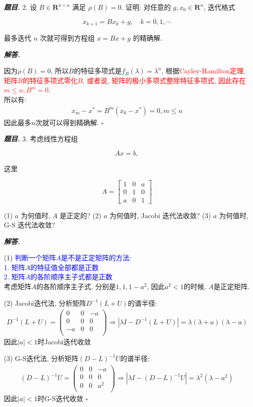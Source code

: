 \documentclass[10pt, a4paper, oneside]{ctexart}
\newenvironment{problem}{\begin{framed}\par\noindent\textbf{\textit{题目. }}}{\end{framed}\par}
\newenvironment{solution}{%
  \par\noindent\textbf{\textit{解答. }}\ignorespaces
}{%
  \hfill\ensuremath{\square}\par %
}
\begin{document}
\begin{problem}
    2. 设 $B \in \mathbf{R}^{n \times n}$ 满足 $\rho(B)=0$. 证明: 对任意的 $g, x_0 \in \mathbf{R}^n$, 迭代格式

    $$
    x_{k+1}=B x_k+g, \quad k=0,1, \cdots
    $$
    
    
    最多迭代 $n$ 次就可得到方程组 $x=B x+g$ 的精确解.
\end{problem}
\begin{solution}
因为$\rho(B)=0$, 所以$B$的特征多项式是$f_B(\lambda)=\lambda^n$, 根据\textcolor{red}{Cayley-Hamilton定理, 矩阵$B$的特征多项式零化$B$, 或者说, 矩阵的极小多项式整除特征多项式, 因此存在$m\leq n, B^m=0$}.\\
所以有:
\begin{align*}
    x_{m}-x^*=B^m(x_0-x^*)=0, m\leq n
\end{align*}
因此最多$n$次就可以得到精确解.
\end{solution}

\begin{problem}
    3. 考虑线性方程组

    $$
    A x=b,
    $$
    
    
    这里
    
    $$
    A=\left[\begin{array}{lll}
    1 & 0 & a \\
    0 & 1 & 0 \\
    a & 0 & 1
    \end{array}\right]
    $$
    
    (1) $a$ 为何值时, $A$ 是正定的?
    (2) $a$ 为何值时, Jacobi 迭代法收敛?
    (3) $a$ 为何值时, G-S 迭代法收敛?
\end{problem}
\begin{solution}
(1) \textcolor{blue}{判断一个矩阵$A$是不是正定矩阵的方法: \\
1. 矩阵$A$的特征值全部都是正数\\
2. 矩阵$A$的各阶顺序主子式都是正数}\\
考虑矩阵$A$的各阶顺序主子式, 分别是$1,1,1-a^2$, 因此$a^2<1$的时候, $A$是正定矩阵.

(2) Jacobi迭代法, 分析矩阵$D^{-1}(L+U)$的谱半径:
\begin{align*}
    D^{-1}(L+U)=\begin{pmatrix}
        0&0&-a\\
        0&0&0\\
        -a&0&0\\
    \end{pmatrix}\Rightarrow |\lambda I-D^{-1}(L+U)|=\lambda(\lambda+a)(\lambda-a)
\end{align*}
因此$|a|<1$时Jacobi迭代收敛

(3) G-S迭代法, 分析矩阵$(D-L)^{-1}U$的谱半径:
\begin{align*}
    (D-L)^{-1}U=\begin{pmatrix}
        0&0&-a\\
        0&0&0\\
        0&0&a^2\\
    \end{pmatrix}\Rightarrow |\lambda I-(D-L)^{-1}U|=\lambda^2(\lambda-a^2)
\end{align*}
因此$|a|<1$时G-S迭代收敛
\end{solution}
\end{document}
